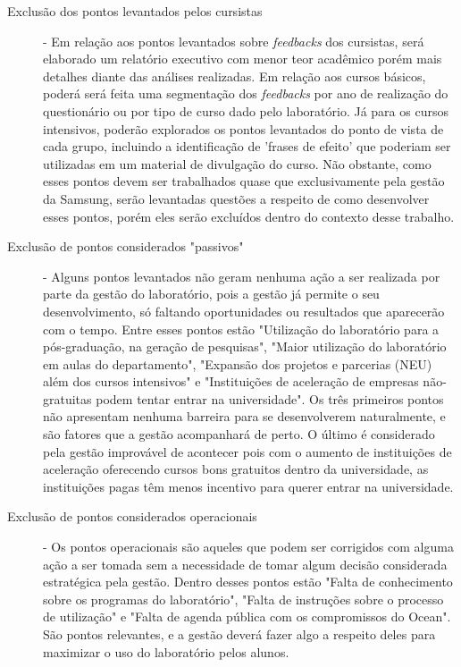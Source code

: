 \begin{description}
\item[Exclusão dos pontos levantados pelos cursistas] - Em relação aos pontos levantados sobre \textit{feedbacks} dos cursistas, será elaborado um relatório executivo com menor teor acadêmico porém mais detalhes diante das análises realizadas. Em relação aos cursos básicos, poderá será feita uma segmentação dos \textit{feedbacks} por ano de realização do questionário ou por tipo de curso dado pelo laboratório. Já para os cursos intensivos, poderão explorados os pontos levantados do ponto de vista de cada grupo, incluindo a identificação de 'frases de efeito' que poderiam ser utilizadas em um material de divulgação do curso. Não obstante, como esses pontos devem ser trabalhados quase que exclusivamente pela gestão da Samsung, serão levantadas questões a respeito de como desenvolver esses pontos, porém eles serão excluídos dentro do contexto desse trabalho.

\item[Exclusão de pontos considerados "passivos"] - Alguns pontos levantados não geram nenhuma ação a ser realizada por parte da gestão do laboratório, pois a gestão já permite o seu desenvolvimento, só faltando oportunidades ou resultados que aparecerão com o tempo. Entre esses pontos estão "Utilização do laboratório para a pós-graduação, na geração de pesquisas", "Maior utilização do laboratório em aulas do departamento", "Expansão dos projetos e parcerias (NEU) além dos cursos intensivos" e "Instituições de aceleração de empresas não-gratuitas podem tentar entrar na universidade". Os três primeiros pontos não apresentam nenhuma barreira para se desenvolverem naturalmente, e são fatores que a gestão acompanhará de perto. O último é considerado pela gestão improvável de acontecer pois com o aumento de instituições de aceleração oferecendo cursos bons gratuitos dentro da universidade, as instituições pagas têm menos incentivo para querer entrar na universidade.

\item[Exclusão de pontos considerados operacionais] - Os pontos operacionais são aqueles que podem ser corrigidos com alguma ação a ser tomada sem a necessidade de tomar algum decisão considerada estratégica pela gestão. Dentro desses pontos estão "Falta de conhecimento sobre os programas do laboratório", "Falta de instruções sobre o processo de utilização" e "Falta de agenda pública com os compromissos do Ocean". São pontos relevantes, e a gestão deverá fazer algo a respeito deles para maximizar o uso do laboratório pelos alunos.

\end{description}

